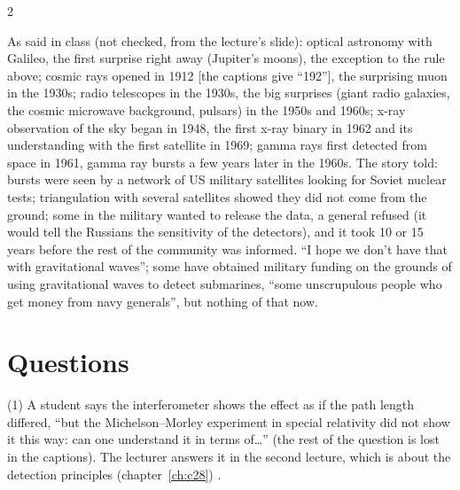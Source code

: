 \begin{paracol}{2}
\begin{history}
As said in class (not checked, from the lecture's slide): optical astronomy with Galileo, the first surprise right away (Jupiter's moons), the exception to the rule above; cosmic rays opened in 1912 [the captions give ``192''], the surprising muon in the 1930s; radio telescopes in the 1930s, the big surprises (giant radio galaxies, the cosmic microwave background, pulsars) in the 1950s and 1960s; x-ray observation of the sky began in 1948, the first x-ray binary in 1962 and its understanding with the first satellite in 1969; gamma rays first detected from space in 1961, gamma ray bursts a few years later in the 1960s. The story told: bursts were seen by a network of US military satellites looking for Soviet nuclear tests; triangulation with several satellites showed they did not come from the ground; some in the military wanted to release the data, a general refused (it would tell the Russians the sensitivity of the detectors), and it took 10 or 15 years before the rest of the community was informed. ``I hope we don't have that with gravitational waves''; some have obtained military funding on the grounds of using gravitational waves to detect submarines, ``some unscrupulous people who get money from navy generals'', but nothing of that now.
\end{history}

\section{Questions}\label{sec:c27-questions}

\begin{coursenote}
(1) A student says the interferometer shows the effect as if the path length differed, ``but the Michelson--Morley experiment in special relativity did not show it this way: can one understand it in terms of\dots'' (the rest of the question is lost in the captions). The lecturer answers it in the second lecture, which is about the detection principles (chapter~\ref{ch:c28}) .


\end{coursenote}
\end{paracol}
